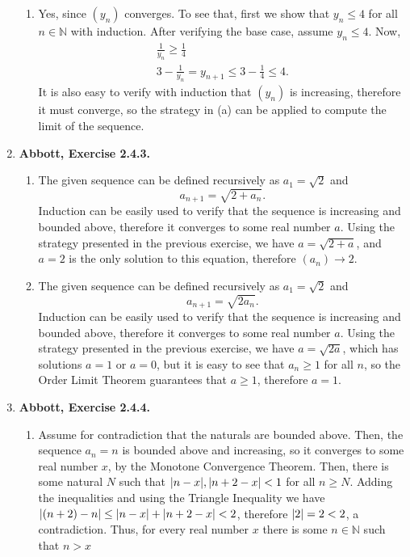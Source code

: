 \documentclass{article}
\DeclarePairedDelimiter\abs{\lvert}{\rvert}
\newcommand{\N}{\mathbb{N}}
\newcommand{\exc}[2][Abbott]{\item \textbf{#1, Exercise #2.}}
\begin{document}
\begin{enumerate}
\begin{enumerate}
        \item Yes, since $(y_n)$ converges. To see that, first we show that $y_n \leq 4$ for all $n \in \N$ with induction. After verifying the base case, assume $y_n \leq 4$. Now, \begin{gather*}
            \frac{1}{y_n} \geq \frac{1}{4} \\ 
            3 - \frac{1}{y_n} = y_{n+1} \leq 3-\frac{1}{4} \leq 4.
        \end{gather*} It is also easy to verify with induction that $(y_n)$ is increasing, therefore it must converge, so the strategy in (a) can be applied to compute the limit of the sequence.
    \end{enumerate}
    
    \exc{2.4.3} 
    \begin{enumerate}
        \item The given sequence can be defined recursively as $a_1 = \sqrt{2}$ and
        \begin{equation*}
            a_{n+1} = \sqrt{2 + a_n}.
        \end{equation*} Induction can be easily used to verify that the sequence is increasing and bounded above, therefore it converges to some real number $a$. Using the strategy presented in the previous exercise, we have $a = \sqrt{2 + a}$, and $a=2$ is the only solution to this equation, therefore $(a_n) \to 2$.
        
        \item The given sequence can be defined recursively as $a_1 = \sqrt{2}$ and
        \begin{equation*}
            a_{n+1} = \sqrt{2 a_n}.
        \end{equation*} Induction can be easily used to verify that the sequence is increasing and bounded above, therefore it converges to some real number $a$. Using the strategy presented in the previous exercise, we have $a = \sqrt{2a}$, which has solutions $a = 1$ or $a = 0$, but it is easy to see that $a_n \geq 1$ for all $n$, so the Order Limit Theorem guarantees that $a \geq 1$, therefore $a = 1$.
    \end{enumerate}
    
    \exc{2.4.4}
    \begin{enumerate}
        \item Assume for contradiction that the naturals are bounded above. Then, the sequence $a_n = n$ is bounded above and increasing, so it converges to some real number $x$, by the Monotone Convergence Theorem. Then, there is some natural $N$ such that $\abs*{n-x}, \abs*{n+2-x} < 1$ for all $n \geq N$. Adding the inequalities and using the Triangle Inequality we have $\abs*{(n+2)-n} \leq \abs*{n-x}+\abs*{n+2-x} < 2$, therefore $\abs*{2}=2 < 2$, a contradiction. Thus, for every real number $x$ there is some $n \in \N$ such that $n > x$
        

\end{enumerate}
\end{enumerate}
\end{document}
